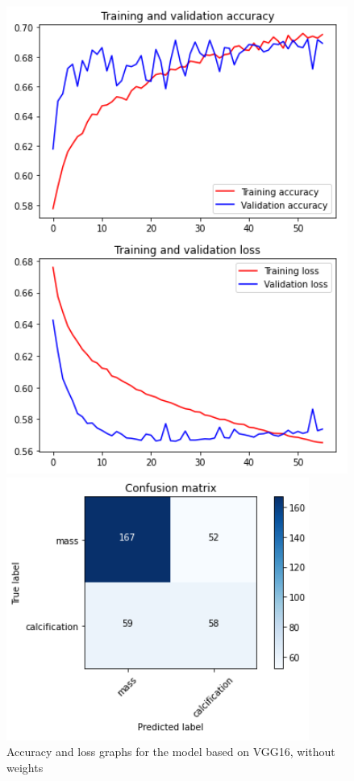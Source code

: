 \documentclass[11pt,a4paper,oneside]{article}
\begin{document}
\begin{figure}[h]
\centering
	\begin{minipage}[c]{.4\textwidth}
		\centering\setlength{\captionmargin}{0pt}%
		\includegraphics[width=.9\textwidth]{images/Task 3/VGG16 3.2/Without Weights/Accuracy}
		\caption{Accuracy and loss graphs for the model based on VGG16, without weights}
		\label{fig:vgg16_3.2_accuracy}
	\end{minipage}
	\hspace{5mm}%
	\begin{minipage}[c]{.4\textwidth}
		\centering\setlength{\captionmargin}{0pt}%
		\includegraphics[width=.9\textwidth]{images/Task 3/VGG16 3.2/Without Weights/Conf Matrix}

\end{minipage}
\end{figure}
\end{document}
